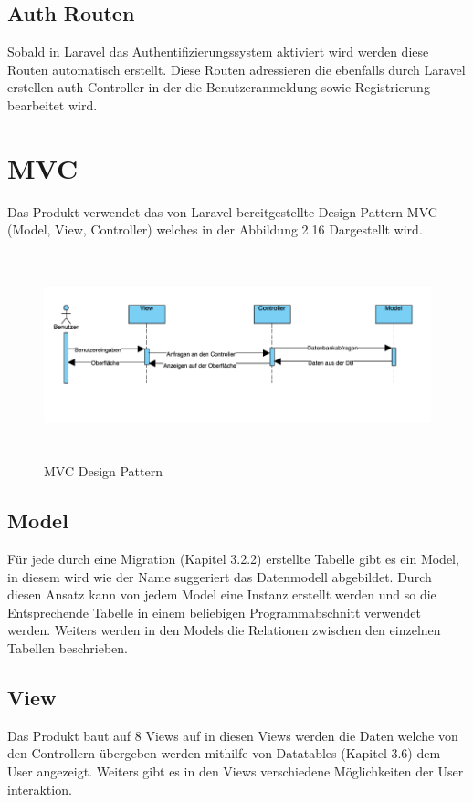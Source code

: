 \subsection{Auth Routen}
Sobald in Laravel das Authentifizierungssystem aktiviert wird werden diese Routen automatisch erstellt. Diese Routen adressieren die ebenfalls durch Laravel erstellen auth Controller in der die Benutzeranmeldung sowie Registrierung bearbeitet wird.

\newpage
\section{MVC}
Das Produkt verwendet das von Laravel bereitgestellte Design Pattern MVC (Model, View, Controller) welches in der Abbildung 2.16 Dargestellt wird. 

\begin{figure}[h]
	\centering
	\includegraphics[height=6cm,width=18cm]{images/MVC}
	\caption{MVC Design Pattern}
	\label{fig:MVC}
\end{figure}

\subsection{Model}
Für jede durch eine Migration (Kapitel 3.2.2)  erstellte Tabelle gibt es ein Model, in diesem wird wie der Name suggeriert das Datenmodell abgebildet. Durch diesen Ansatz kann von jedem Model eine Instanz erstellt werden und so die Entsprechende Tabelle in einem beliebigen Programmabschnitt verwendet werden. Weiters werden in den Models die Relationen zwischen den einzelnen Tabellen beschrieben.
\subsection{View}
Das Produkt baut auf 8 Views auf in diesen Views werden die Daten welche von den Controllern übergeben werden mithilfe von Datatables (Kapitel 3.6) dem User angezeigt. Weiters gibt es in den Views verschiedene Möglichkeiten der User interaktion.
